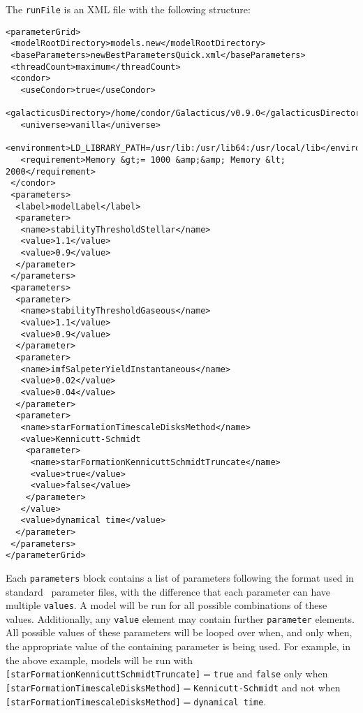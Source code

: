 The {\tt runFile} is an XML file with the following structure:
\begin{verbatim}
<parameterGrid>
 <modelRootDirectory>models.new</modelRootDirectory>
 <baseParameters>newBestParametersQuick.xml</baseParameters>
 <threadCount>maximum</threadCount>
 <condor>
   <useCondor>true</useCondor>
   <galacticusDirectory>/home/condor/Galacticus/v0.9.0</galacticusDirectory>
   <universe>vanilla</universe>
   <environment>LD_LIBRARY_PATH=/usr/lib:/usr/lib64:/usr/local/lib</environment>
   <requirement>Memory &gt;= 1000 &amp;&amp; Memory &lt; 2000</requirement>
 </condor>
 <parameters>
  <label>modelLabel</label>
  <parameter>
   <name>stabilityThresholdStellar</name>
   <value>1.1</value>
   <value>0.9</value>
  </parameter>
 </parameters>
 <parameters>
  <parameter>
   <name>stabilityThresholdGaseous</name>
   <value>1.1</value>
   <value>0.9</value>
  </parameter>
  <parameter>
   <name>imfSalpeterYieldInstantaneous</name>
   <value>0.02</value>
   <value>0.04</value>
  </parameter>
  <parameter>
   <name>starFormationTimescaleDisksMethod</name>
   <value>Kennicutt-Schmidt
    <parameter>
     <name>starFormationKennicuttSchmidtTruncate</name>
     <value>true</value>
     <value>false</value>
    </parameter>
   </value>
   <value>dynamical time</value>
  </parameter>
 </parameters>
</parameterGrid>
\end{verbatim}
Each {\tt parameters} block contains a list of parameters following the format used in standard \glc\ parameter files, with the difference that each parameter can have multiple {\tt values}. A model will be run for all possible combinations of these values. Additionally, any {\tt value} element may contain further {\tt parameter} elements. All possible values of these parameters will be looped over when, and only when, the appropriate value of the containing parameter is being used. For example, in the above example, models will be run with {\tt [starFormationKennicuttSchmidtTruncate]}$=${\tt true} and {\tt false} only when {\tt [starFormationTimescaleDisksMethod]}$=${\tt Kennicutt-Schmidt} and not when {\tt [starFormationTimescaleDisksMethod]}$=${\tt dynamical time}.

